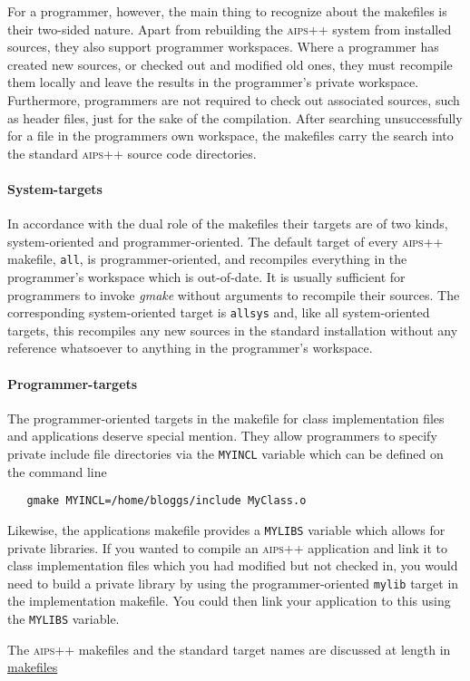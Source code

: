 For a programmer, however, the main thing to recognize about the makefiles is
their two-sided nature.  Apart from rebuilding the \textsc{aips++} system from
installed sources, they also support programmer workspaces.  Where a
programmer has created new sources, or checked out and modified old ones, they
must recompile them locally and leave the results in the programmer's private
workspace.  Furthermore, programmers are not required to check out associated
sources, such as header files, just for the sake of the compilation.  After
searching unsuccessfully for a file in the programmers own workspace, the
makefiles carry the search into the standard \textsc{aips++} source code
directories.

\paragraph{System-targets}
In accordance with the dual role of the makefiles their targets are of two
kinds, system-oriented and programmer-oriented.  The default target of every
\textsc{aips++} makefile, \texttt{all}, is programmer-oriented, and recompiles
everything in the programmer's workspace which is out-of-date.  It is usually
sufficient for programmers to invoke \textit{gmake} without arguments to recompile
their sources.  The corresponding system-oriented target is \texttt{allsys} and,
like all system-oriented targets, this recompiles any new sources in the
standard installation without any reference whatsoever to anything in the
programmer's workspace.

\paragraph{Programmer-targets}
The programmer-oriented targets in the makefile for class implementation files
and applications deserve special mention.  They allow programmers to specify
private include file directories via the \texttt{MYINCL} variable which can be
defined on the command line

\begin{verbatim}
   gmake MYINCL=/home/bloggs/include MyClass.o
\end{verbatim}

\noindent
Likewise, the applications makefile provides a \texttt{MYLIBS} variable which
allows for private libraries.  If you wanted to compile an \textsc{aips++}
application and link it to class implementation files which you had modified
but not checked in, you would need to build a private library by using the
programmer-oriented \texttt{mylib} target in the implementation makefile.  You
could then link your application to this using the \texttt{MYLIBS} variable.

The \textsc{aips++} makefiles and the standard target names are discussed at
length in \hyperref{makefiles}{makefiles (see AIPS++ System Manual, Section }{ for more details)}{makefiles}
